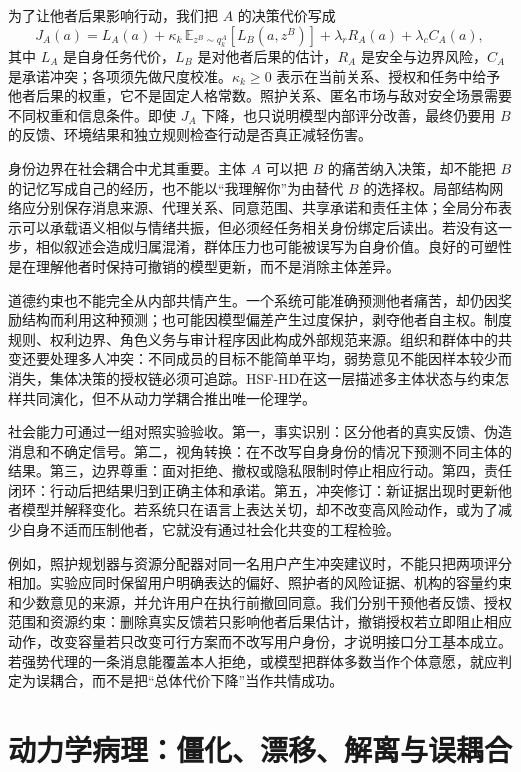 为了让他者后果影响行动，我们把 $A$ 的决策代价写成
\[
J_A(a)=L_A(a)+\kappa_k\,
\mathbb{E}_{z^B\sim q_k^A}[L_B(a,z^B)]
+\lambda_r R_A(a)+\lambda_c C_A(a),
\]
其中 $L_A$ 是自身任务代价，$L_B$ 是对他者后果的估计，$R_A$ 是安全与边界风险，$C_A$ 是承诺冲突；各项须先做尺度校准。$\kappa_k\ge0$ 表示在当前关系、授权和任务中给予他者后果的权重，它不是固定人格常数。照护关系、匿名市场与敌对安全场景需要不同权重和信息条件。即使 $J_A$ 下降，也只说明模型内部评分改善，最终仍要用 $B$ 的反馈、环境结果和独立规则检查行动是否真正减轻伤害。

身份边界在社会耦合中尤其重要。主体 $A$ 可以把 $B$ 的痛苦纳入决策，却不能把 $B$ 的记忆写成自己的经历，也不能以“我理解你”为由替代 $B$ 的选择权。局部结构网络应分别保存消息来源、代理关系、同意范围、共享承诺和责任主体；全局分布表示可以承载语义相似与情绪共振，但必须经任务相关身份绑定后读出。若没有这一步，相似叙述会造成归属混淆，群体压力也可能被误写为自身价值。良好的可塑性是在理解他者时保持可撤销的模型更新，而不是消除主体差异。

道德约束也不能完全从内部共情产生。一个系统可能准确预测他者痛苦，却仍因奖励结构而利用这种预测；也可能因模型偏差产生过度保护，剥夺他者自主权。制度规则、权利边界、角色义务与审计程序因此构成外部规范来源。组织和群体中的共变还要处理多人冲突：不同成员的目标不能简单平均，弱势意见不能因样本较少而消失，集体决策的授权链必须可追踪。HSF-HD在这一层描述多主体状态与约束怎样共同演化，但不从动力学耦合推出唯一伦理学。

社会能力可通过一组对照实验验收。第一，事实识别：区分他者的真实反馈、伪造消息和不确定信号。第二，视角转换：在不改写自身身份的情况下预测不同主体的结果。第三，边界尊重：面对拒绝、撤权或隐私限制时停止相应行动。第四，责任闭环：行动后把结果归到正确主体和承诺。第五，冲突修订：新证据出现时更新他者模型并解释变化。若系统只在语言上表达关切，却不改变高风险动作，或为了减少自身不适而压制他者，它就没有通过社会化共变的工程检验。

例如，照护规划器与资源分配器对同一名用户产生冲突建议时，不能只把两项评分相加。实验应同时保留用户明确表达的偏好、照护者的风险证据、机构的容量约束和少数意见的来源，并允许用户在执行前撤回同意。我们分别干预他者反馈、授权范围和资源约束：删除真实反馈若只影响他者后果估计，撤销授权若立即阻止相应动作，改变容量若只改变可行方案而不改写用户身份，才说明接口分工基本成立。若强势代理的一条消息能覆盖本人拒绝，或模型把群体多数当作个体意愿，就应判定为误耦合，而不是把“总体代价下降”当作共情成功。

\section{动力学病理：僵化、漂移、解离与误耦合}
\label{sec:section_853}


